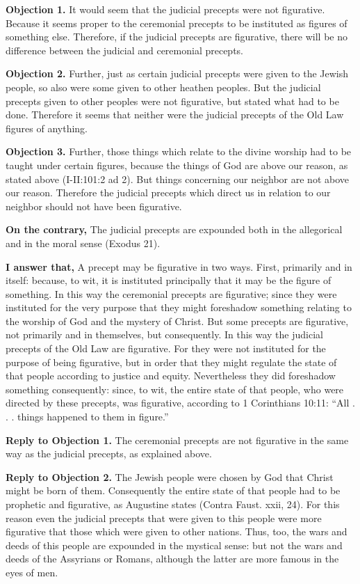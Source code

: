 \textbf{Objection 1.} It would seem that the judicial precepts were not figurative. Because it seems proper to the ceremonial precepts to be instituted as figures of something else. Therefore, if the judicial precepts are figurative, there will be no difference between the judicial and ceremonial precepts.

\textbf{Objection 2.} Further, just as certain judicial precepts were given to the Jewish people, so also were some given to other heathen peoples. But the judicial precepts given to other peoples were not figurative, but stated what had to be done. Therefore it seems that neither were the judicial precepts of the Old Law figures of anything.

\textbf{Objection 3.} Further, those things which relate to the divine worship had to be taught under certain figures, because the things of God are above our reason, as stated above (I-II:101:2 ad 2). But things concerning our neighbor are not above our reason. Therefore the judicial precepts which direct us in relation to our neighbor should not have been figurative.

\textbf{On the contrary,} The judicial precepts are expounded both in the allegorical and in the moral sense (Exodus 21).

\textbf{I answer that,} A precept may be figurative in two ways. First, primarily and in itself: because, to wit, it is instituted principally that it may be the figure of something. In this way the ceremonial precepts are figurative; since they were instituted for the very purpose that they might foreshadow something relating to the worship of God and the mystery of Christ. But some precepts are figurative, not primarily and in themselves, but consequently. In this way the judicial precepts of the Old Law are figurative. For they were not instituted for the purpose of being figurative, but in order that they might regulate the state of that people according to justice and equity. Nevertheless they did foreshadow something consequently: since, to wit, the entire state of that people, who were directed by these precepts, was figurative, according to 1 Corinthians 10:11: ``All . . . things happened to them in figure.''

\textbf{Reply to Objection 1.} The ceremonial precepts are not figurative in the same way as the judicial precepts, as explained above.

\textbf{Reply to Objection 2.} The Jewish people were chosen by God that Christ might be born of them. Consequently the entire state of that people had to be prophetic and figurative, as Augustine states (Contra Faust. xxii, 24). For this reason even the judicial precepts that were given to this people were more figurative that those which were given to other nations. Thus, too, the wars and deeds of this people are expounded in the mystical sense: but not the wars and deeds of the Assyrians or Romans, although the latter are more famous in the eyes of men.


